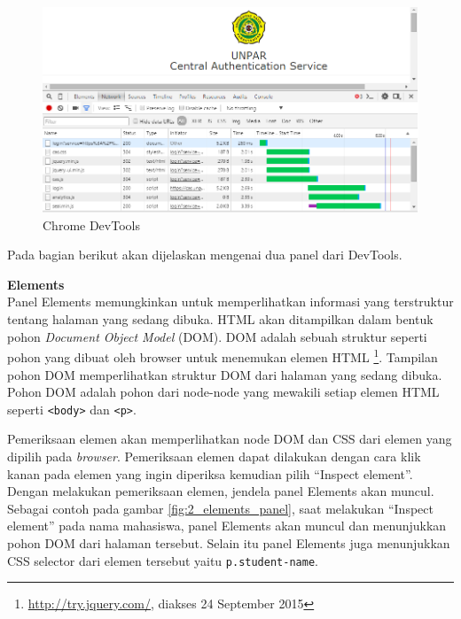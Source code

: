 \documentclass[a4paper,twoside]{article}
\begin{document}
\begin{enumerate}
\begin{enumerate}
\begin{figure}[H]
	\centering
	\includegraphics[scale=0.5]{Gambar/chrome-devtools}
	\caption{Chrome DevTools} 
	\label{fig:2_chrome_devtools}
\end{figure}

Pada bagian berikut akan dijelaskan mengenai dua panel dari DevTools.

\textbf{Elements}\\
Panel Elements memungkinkan untuk memperlihatkan informasi yang terstruktur tentang halaman yang sedang dibuka. HTML akan ditampilkan dalam bentuk pohon \textit{Document Object Model} (DOM). DOM adalah sebuah struktur seperti pohon yang dibuat oleh browser untuk menemukan elemen HTML \footnote{\url{http://try.jquery.com/}, diakses 24 September 2015}. Tampilan pohon DOM memperlihatkan struktur DOM dari halaman yang sedang dibuka. Pohon DOM adalah pohon dari node-node yang mewakili setiap elemen HTML seperti \texttt{<body>} dan \texttt{<p>}. 

Pemeriksaan elemen akan memperlihatkan node DOM dan CSS dari elemen yang dipilih pada \textit{browser}. Pemeriksaan elemen dapat dilakukan dengan cara klik kanan pada elemen yang ingin diperiksa kemudian pilih ``Inspect element''. Dengan melakukan pemeriksaan elemen, jendela panel Elements akan muncul. Sebagai contoh pada gambar \ref{fig:2_elements_panel}, saat melakukan ``Inspect element'' pada nama mahasiswa, panel Elements akan muncul dan menunjukkan pohon DOM dari halaman tersebut. Selain itu panel Elements juga menunjukkan CSS selector dari elemen tersebut yaitu \texttt{p.student-name}.


\end{enumerate}
\end{enumerate}
\end{document}
